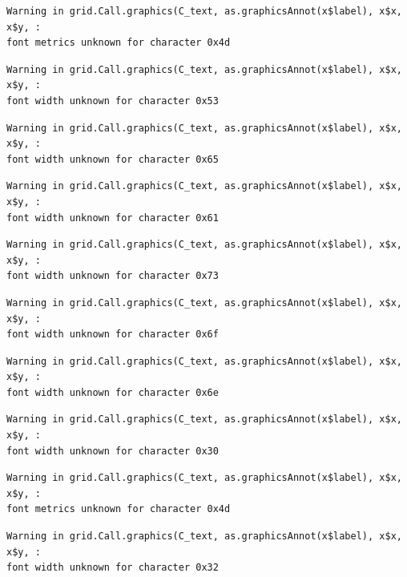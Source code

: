 \documentclass[
  letterpaper,
]{scrbook}
\begin{document}
\begin{verbatim}
Warning in grid.Call.graphics(C_text, as.graphicsAnnot(x$label), x$x, x$y, :
font metrics unknown for character 0x4d
\end{verbatim}

\begin{verbatim}
Warning in grid.Call.graphics(C_text, as.graphicsAnnot(x$label), x$x, x$y, :
font width unknown for character 0x53
\end{verbatim}

\begin{verbatim}
Warning in grid.Call.graphics(C_text, as.graphicsAnnot(x$label), x$x, x$y, :
font width unknown for character 0x65
\end{verbatim}

\begin{verbatim}
Warning in grid.Call.graphics(C_text, as.graphicsAnnot(x$label), x$x, x$y, :
font width unknown for character 0x61
\end{verbatim}

\begin{verbatim}
Warning in grid.Call.graphics(C_text, as.graphicsAnnot(x$label), x$x, x$y, :
font width unknown for character 0x73
\end{verbatim}

\begin{verbatim}
Warning in grid.Call.graphics(C_text, as.graphicsAnnot(x$label), x$x, x$y, :
font width unknown for character 0x6f
\end{verbatim}

\begin{verbatim}
Warning in grid.Call.graphics(C_text, as.graphicsAnnot(x$label), x$x, x$y, :
font width unknown for character 0x6e
\end{verbatim}

\begin{verbatim}
Warning in grid.Call.graphics(C_text, as.graphicsAnnot(x$label), x$x, x$y, :
font width unknown for character 0x30
\end{verbatim}

\begin{verbatim}
Warning in grid.Call.graphics(C_text, as.graphicsAnnot(x$label), x$x, x$y, :
font metrics unknown for character 0x4d
\end{verbatim}

\begin{verbatim}
Warning in grid.Call.graphics(C_text, as.graphicsAnnot(x$label), x$x, x$y, :
font width unknown for character 0x32
\end{verbatim}
\end{document}
